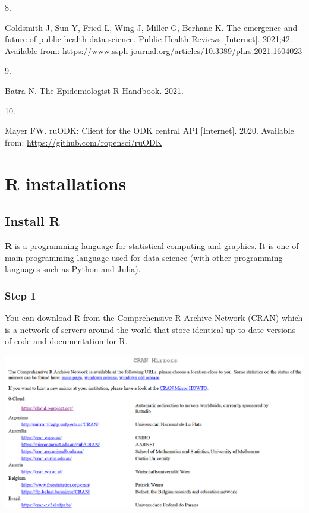 \documentclass[
  letterpaper,
  DIV=11,
  numbers=noendperiod,
  oneside]{scrreprt}
\newlength{\cslhangindent}
\newlength{\csllabelwidth}
\newlength{\cslentryspacingunit} %
\newenvironment{CSLReferences}[2] %
 {%
  \setlength{\parindent}{0pt}
  \ifodd #1
  \let\oldpar\par
  \def\par{\hangindent=\cslhangindent\oldpar}
  \fi
  \setlength{\parskip}{#2\cslentryspacingunit}
 }%
 {}
\newcommand{\CSLLeftMargin}[1]{\parbox[t]{\csllabelwidth}{#1}}
\newcommand{\CSLRightInline}[1]{\parbox[t]{\linewidth - \csllabelwidth}{#1}\break}
\begin{document}
\begin{CSLReferences}{0}{0}
\leavevmode{}%
\CSLLeftMargin{8. }%
\CSLRightInline{Goldsmith J, Sun Y, Fried L, Wing J, Miller G, Berhane
K. The emergence and future of public health data science. Public Health
Reviews {[}Internet{]}. 2021;42. Available from:
\url{https://www.ssph-journal.org/articles/10.3389/phrs.2021.1604023}}

\leavevmode{}%
\CSLLeftMargin{9. }%
\CSLRightInline{Batra N. {The Epidemiologist R Handbook}. 2021. }

\leavevmode{}%
\CSLLeftMargin{10. }%
\CSLRightInline{Mayer FW. ruODK: Client for the ODK central API
{[}Internet{]}. 2020. Available from:
\url{https://github.com/ropensci/ruODK}}

\end{CSLReferences}

\cleardoublepage
{}
{}
\appendix

\hypertarget{r-installations}{%
\chapter{R installations}\label{r-installations}}

\hypertarget{sec-R-installation}{%
\section{Install R}\label{sec-R-installation}}

\textbf{R} is a programming language for statistical computing and
graphics. It is one of main programming language used for data science
(with other programming languages such as Python and Julia).

\subsection{Step 1}

You can download R from the
\href{https://cran.r-project.org/mirrors.html}{Comprehensive R Archive
Network (CRAN)} which is a network of servers around the world that
store identical up-to-date versions of code and documentation for R.

\includegraphics{images/paste-13103C13.png}
\end{document}
